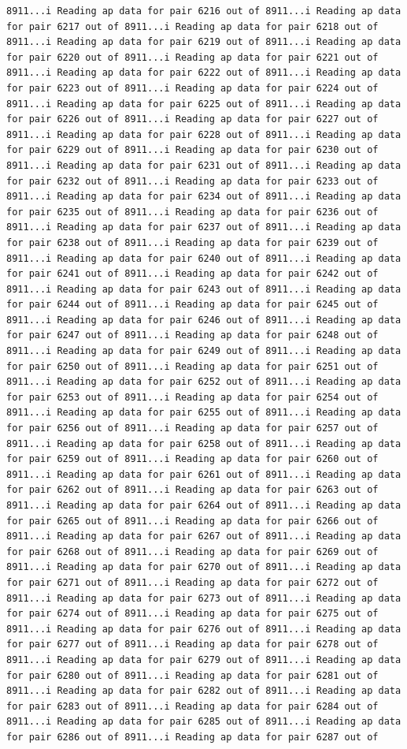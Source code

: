 \documentclass[
]{article}
\begin{document}
\begin{verbatim}
8911...i Reading ap data for pair 6216 out of 8911...i Reading ap data for pair 6217 out of 8911...i Reading ap data for pair 6218 out of 8911...i Reading ap data for pair 6219 out of 8911...i Reading ap data for pair 6220 out of 8911...i Reading ap data for pair 6221 out of 8911...i Reading ap data for pair 6222 out of 8911...i Reading ap data for pair 6223 out of 8911...i Reading ap data for pair 6224 out of 8911...i Reading ap data for pair 6225 out of 8911...i Reading ap data for pair 6226 out of 8911...i Reading ap data for pair 6227 out of 8911...i Reading ap data for pair 6228 out of 8911...i Reading ap data for pair 6229 out of 8911...i Reading ap data for pair 6230 out of 8911...i Reading ap data for pair 6231 out of 8911...i Reading ap data for pair 6232 out of 8911...i Reading ap data for pair 6233 out of 8911...i Reading ap data for pair 6234 out of 8911...i Reading ap data for pair 6235 out of 8911...i Reading ap data for pair 6236 out of 8911...i Reading ap data for pair 6237 out of 8911...i Reading ap data for pair 6238 out of 8911...i Reading ap data for pair 6239 out of 8911...i Reading ap data for pair 6240 out of 8911...i Reading ap data for pair 6241 out of 8911...i Reading ap data for pair 6242 out of 8911...i Reading ap data for pair 6243 out of 8911...i Reading ap data for pair 6244 out of 8911...i Reading ap data for pair 6245 out of 8911...i Reading ap data for pair 6246 out of 8911...i Reading ap data for pair 6247 out of 8911...i Reading ap data for pair 6248 out of 8911...i Reading ap data for pair 6249 out of 8911...i Reading ap data for pair 6250 out of 8911...i Reading ap data for pair 6251 out of 8911...i Reading ap data for pair 6252 out of 8911...i Reading ap data for pair 6253 out of 8911...i Reading ap data for pair 6254 out of 8911...i Reading ap data for pair 6255 out of 8911...i Reading ap data for pair 6256 out of 8911...i Reading ap data for pair 6257 out of 8911...i Reading ap data for pair 6258 out of 8911...i Reading ap data for pair 6259 out of 8911...i Reading ap data for pair 6260 out of 8911...i Reading ap data for pair 6261 out of 8911...i Reading ap data for pair 6262 out of 8911...i Reading ap data for pair 6263 out of 8911...i Reading ap data for pair 6264 out of 8911...i Reading ap data for pair 6265 out of 8911...i Reading ap data for pair 6266 out of 8911...i Reading ap data for pair 6267 out of 8911...i Reading ap data for pair 6268 out of 8911...i Reading ap data for pair 6269 out of 8911...i Reading ap data for pair 6270 out of 8911...i Reading ap data for pair 6271 out of 8911...i Reading ap data for pair 6272 out of 8911...i Reading ap data for pair 6273 out of 8911...i Reading ap data for pair 6274 out of 8911...i Reading ap data for pair 6275 out of 8911...i Reading ap data for pair 6276 out of 8911...i Reading ap data for pair 6277 out of 8911...i Reading ap data for pair 6278 out of 8911...i Reading ap data for pair 6279 out of 8911...i Reading ap data for pair 6280 out of 8911...i Reading ap data for pair 6281 out of 8911...i Reading ap data for pair 6282 out of 8911...i Reading ap data for pair 6283 out of 8911...i Reading ap data for pair 6284 out of 8911...i Reading ap data for pair 6285 out of 8911...i Reading ap data for pair 6286 out of 8911...i Reading ap data for pair 6287 out of 
\end{verbatim}
\end{document}
